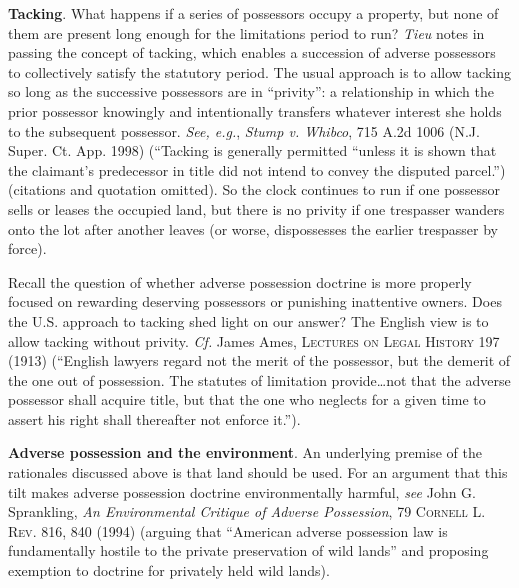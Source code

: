 \item \textbf{Tacking}. What happens if a series of possessors occupy a
property, but none of them are present long enough for the limitations period
to run? \textit{Tieu} notes in passing the concept of tacking, which enables a
succession of adverse possessors to collectively satisfy the statutory period.
The usual approach is to allow tacking so long as the successive possessors are
in ``privity'': a relationship in which the prior possessor knowingly and
intentionally transfers whatever interest she holds to the subsequent
possessor. \textit{See, e.g.}, \emph{Stump v. Whibco}, 715 A.2d 1006 (N.J.
Super. Ct.
App. 1998) (``Tacking is generally permitted ``unless it is shown that the
claimant's predecessor in title did not intend to convey the disputed
parcel.'') (citations and quotation omitted). So the clock continues to run if
one possessor sells or leases the occupied land, but there is no privity if one
trespasser wanders onto the lot after another leaves (or worse, dispossesses
the earlier trespasser by force). 

Recall the question of whether adverse possession doctrine is more properly
focused on rewarding deserving possessors or punishing inattentive owners. Does
the U.S. approach to tacking shed light on our answer? The English view is to
allow tacking without privity. \textit{Cf.} James Ames, \textsc{Lectures on
Legal History} 197 (1913) (``English lawyers regard not the merit of the
possessor, but the demerit of the one out of possession. The statutes of
limitation provide\ldots not that the adverse possessor shall acquire title,
but that the one who neglects for a given time to assert his right shall
thereafter not enforce it.'').

\item \textbf{Adverse possession and the environment}. An underlying
premise of the rationales discussed above is that land should be used. For an
argument that this tilt makes adverse possession doctrine environmentally
harmful, \textit{see} John G. Sprankling, \textit{An Environmental Critique of
Adverse Possession}, 79 \textsc{Cornell L. Rev}. 816, 840 (1994) (arguing that
``American adverse possession law is fundamentally hostile to the private
preservation of wild lands'' and proposing exemption to doctrine for privately
held wild lands).

